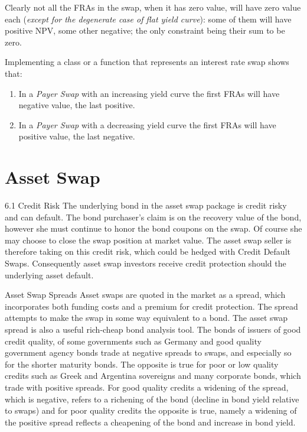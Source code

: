 \documentclass[12pt,a4paper]{article}
\begin{document}
Clearly not all the FRAs in the swap, when it has zero value, will have zero value each (\emph{except for the degenerate case of flat yield curve}): some of them will have positive NPV, some other negative; the only constraint being their sum to be zero.

\begin{question}
Implementing a class or a function that represents an interest rate swap shows that:
\begin{enumerate}
\item In a \emph{Payer Swap} with an increasing yield curve the first FRAs will have negative value, the last positive. 
\item In a \emph{Payer Swap} with a decreasing yield curve the first FRAs will have positive value, the last negative.
\end{enumerate}
\end{question}

\clearpage
\section{Asset Swap}

	6.1
Credit Risk
The underlying bond in the asset swap package is credit risky and can default. The bond purchaser’s claim is on the recovery value of the bond, however she must continue to honor the
bond coupons on the swap. Of course she may choose to close the swap position at market
value. The asset swap seller is therefore taking on this credit risk, which could be hedged with
Credit Default Swaps. Consequently asset swap investors receive credit protection should the underlying asset default.

Asset Swap Spreads
Asset swaps are quoted in the market as a spread, which incorporates both funding costs and a
premium for credit protection. The spread attempts to make the swap in some way equivalent
to a bond. The asset swap spread is also a useful rich-cheap bond analysis tool.
The bonds of issuers of good credit quality, of some governments such as Germany and good
quality government agency bonds trade at negative spreads to swaps, and especially so for the
shorter maturity bonds. The opposite is true for poor or low quality credits such as Greek
and Argentina sovereigns and many corporate bonds, which trade with positive spreads. For
good quality credits a widening of the spread, which is negative, refers to a richening of the
bond (decline in bond yield relative to swaps) and for poor quality credits the opposite is true,
namely a widening of the positive spread reflects a cheapening of the bond and increase in bond
yield.
\end{document}
